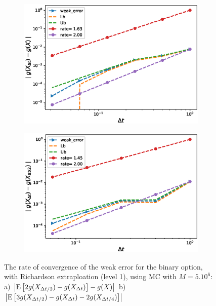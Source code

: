 \documentclass[11pt]{article}
\newcommand{\expt}[1]{\mathrm{E}\left[#1\right]}
\begin{document}
\begin{figure}[h!]
	\centering
	\begin{subfigure}{.4\textwidth}
		\centering
		\includegraphics[width=1\linewidth]{./figures/binary_weak_error/with_richardson/weak_convergence_order_binary_richardson_relative_M_5_10_6}
		\caption{}
		\label{fig:sub3}
	\end{subfigure}%
	\begin{subfigure}{.4\textwidth}
		\centering
		\includegraphics[width=1\linewidth]{./figures/binary_weak_error/with_richardson/weak_convergence_order_differences_binary_richardson_relative_M_5_10_6}
		\caption{}
		\label{fig:sub4}
	\end{subfigure}
	
	\caption{The rate of convergence of the weak error for the binary option, with Richardson extraploation (level 1), using MC with $M=5.10^6$: a) $\abs{\expt{2 g(X_{\Delta t/2}) -g(X_{\Delta t})}-g(X)}$  b) $\abs{\expt{3 g(X_{\Delta t/2})-g(X_{\Delta t})-2 g(X_{\Delta t/4})}}$ }
	\label{fig:fig:Weak_rate_binary_with_rich}
\end{figure}
\end{document}
